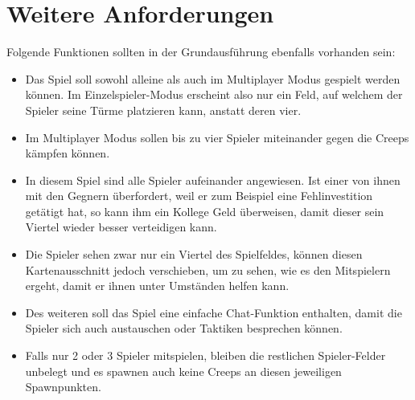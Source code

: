 \section{Weitere Anforderungen}
Folgende Funktionen sollten in der Grundausführung ebenfalls vorhanden sein:

\begin{itemize}
\item Das Spiel soll sowohl alleine als auch im Multiplayer Modus gespielt werden können. Im Einzelspieler-Modus erscheint also nur ein Feld, auf welchem der Spieler seine Türme platzieren kann, anstatt deren vier.
\item Im Multiplayer Modus sollen bis zu vier Spieler miteinander gegen die Creeps kämpfen können.
\item In diesem Spiel sind alle Spieler aufeinander angewiesen. Ist einer von ihnen mit den Gegnern überfordert, weil er zum Beispiel eine Fehlinvestition getätigt hat, so kann ihm ein Kollege Geld überweisen, damit dieser sein Viertel wieder besser verteidigen kann.
\item Die Spieler sehen zwar nur ein Viertel des Spielfeldes, können diesen Kartenausschnitt jedoch verschieben, um zu sehen, wie es den Mitspielern ergeht, damit er ihnen unter Umständen helfen kann.
\item Des weiteren soll das Spiel eine einfache Chat-Funktion enthalten, damit die Spieler sich auch austauschen oder Taktiken besprechen können.
\item Falls nur 2 oder 3 Spieler mitspielen, bleiben die restlichen Spieler-Felder unbelegt und es spawnen auch keine Creeps an diesen jeweiligen Spawnpunkten.
\end{itemize}

